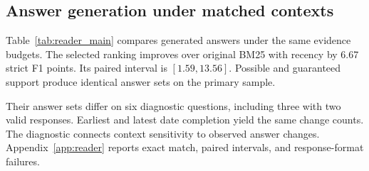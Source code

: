 \subsection{Answer generation under matched contexts}
Table~\ref{tab:reader_main} compares generated answers under the same evidence budgets.
The selected ranking improves over original BM25 with recency by 6.67 strict F1 points.
Its paired interval is $[1.59,13.56]$.
Possible and guaranteed support produce identical answer sets on the primary sample.


Their answer sets differ on six diagnostic questions, including three with two valid responses.
Earliest and latest date completion yield the same change counts.
The diagnostic connects context sensitivity to observed answer changes.
Appendix~\ref{app:reader} reports exact match, paired intervals, and response-format failures.
